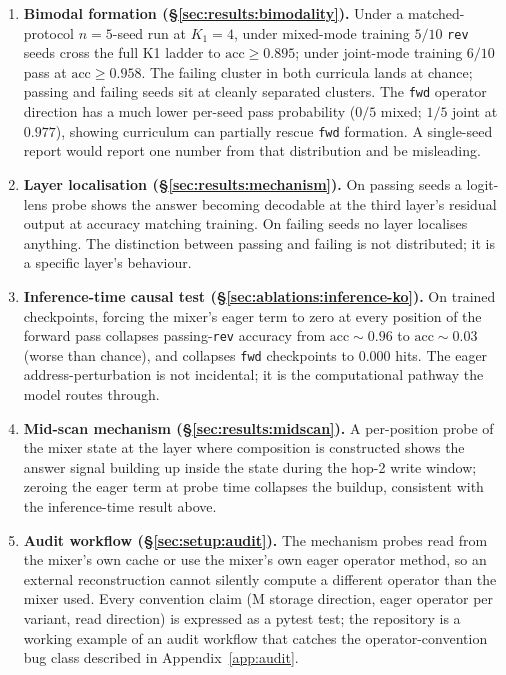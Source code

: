 \documentclass[11pt]{article}
\newcommand{\claim}[1]{#1}
\begin{document}
\begin{enumerate}
\item \textbf{Bimodal formation (\S\ref{sec:results:bimodality}).}
      Under a matched-protocol $n=5$-seed run at $K_1 = 4$,
      under mixed-mode training \claim{$5/10$} \texttt{rev} seeds
      cross the full K1 ladder to $\text{acc} \geq 0.895$; under
      joint-mode training \claim{$6/10$} pass at $\text{acc} \geq
      0.958$. The failing cluster in both curricula lands at chance;
      passing and failing seeds sit at cleanly separated clusters.
      The \texttt{fwd} operator direction has a much lower per-seed
      pass probability ($0/5$ mixed; $1/5$ joint at $0.977$), showing
      curriculum can partially rescue \texttt{fwd} formation. A
      single-seed report would report one number from that
      distribution and be misleading.

\item \textbf{Layer localisation (\S\ref{sec:results:mechanism}).} On
      passing seeds a logit-lens probe shows the answer becoming
      decodable at the third layer's residual output at accuracy
      matching training. On failing seeds no layer localises anything.
      The distinction between passing and failing is not distributed;
      it is a specific layer's behaviour.

\item \textbf{Inference-time causal test
      (\S\ref{sec:ablations:inference-ko}).} On trained checkpoints,
      forcing the mixer's eager term to zero at every position of the
      forward pass collapses passing-\texttt{rev} accuracy from
      $\text{acc} \sim 0.96$ to $\text{acc} \sim 0.03$ (worse than
      chance), and collapses \texttt{fwd} checkpoints to $0.000$ hits.
      The eager address-perturbation is not incidental; it is the
      computational pathway the model routes through.

\item \textbf{Mid-scan mechanism (\S\ref{sec:results:midscan}).} A
      per-position probe of the mixer state at the layer where
      composition is constructed shows the answer signal building up
      inside the state during the hop-2 write window; zeroing the
      eager term at probe time collapses the buildup, consistent with
      the inference-time result above.

\item \textbf{Audit workflow (\S\ref{sec:setup:audit}).} The mechanism
      probes read from the mixer's own cache or use the mixer's own
      eager operator method, so an external reconstruction cannot
      silently compute a different operator than the mixer used. Every
      convention claim (M storage direction, eager operator per
      variant, read direction) is expressed as a pytest test; the
      repository is a working example of an audit workflow that
      catches the operator-convention bug class described in
      Appendix~\ref{app:audit}.
\end{enumerate}
\end{document}

